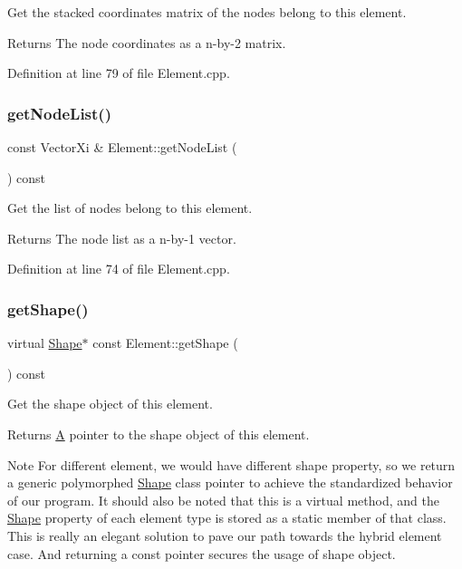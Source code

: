 Get the stacked coordinates matrix of the nodes belong to this element. 

\begin{DoxyReturn}{Returns}
The node coordinates as a n-\/by-\/2 matrix. 
\end{DoxyReturn}


Definition at line 79 of file Element.\+cpp.

\mbox{\label{class_element_a763e0e4a46e68823903557a605dc5474}} 
\subsubsection{\texorpdfstring{get\+Node\+List()}{getNodeList()}}
{\footnotesize\ttfamily const Vector\+Xi \& Element\+::get\+Node\+List (\begin{DoxyParamCaption}{ }\end{DoxyParamCaption}) const}



Get the list of nodes belong to this element. 

\begin{DoxyReturn}{Returns}
The node list as a n-\/by-\/1 vector. 
\end{DoxyReturn}


Definition at line 74 of file Element.\+cpp.

\mbox{\label{class_element_a54c5c297abff4ac3abacd815342a9645}} 
\subsubsection{\texorpdfstring{get\+Shape()}{getShape()}}
{\footnotesize\ttfamily virtual \mbox{\hyperlink{class_shape}{Shape}}$\ast$ const Element\+::get\+Shape (\begin{DoxyParamCaption}{ }\end{DoxyParamCaption}) const\hspace{0.3cm}{\ttfamily [pure virtual]}}



Get the shape object of this element. 

\begin{DoxyReturn}{Returns}
\mbox{\hyperlink{class_a}{A}} pointer to the shape object of this element.
\end{DoxyReturn}
\begin{DoxyNote}{Note}
For different element, we would have different shape property, so we return a generic polymorphed \mbox{\hyperlink{class_shape}{Shape}} class pointer to achieve the standardized behavior of our program. It should also be noted that this is a virtual method, and the \mbox{\hyperlink{class_shape}{Shape}} property of each element type is stored as a static member of that class. This is really an elegant solution to pave our path towards the hybrid element case. And returning a const pointer secures the usage of shape object. 
\end{DoxyNote}


